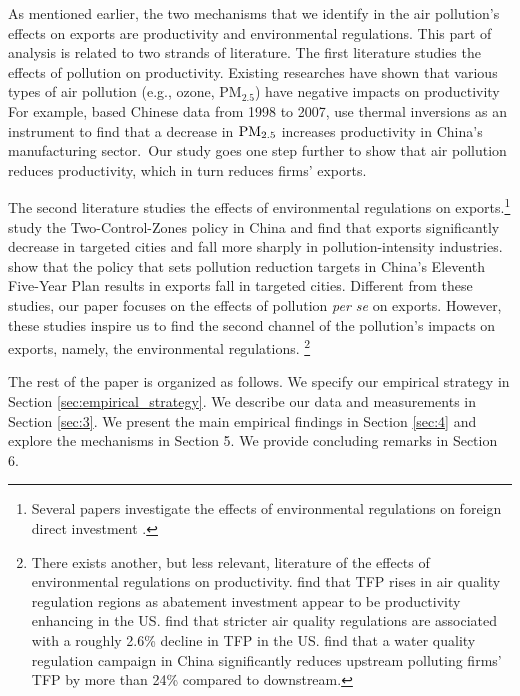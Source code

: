 \documentclass[12pt]{article}
\begin{document}
As mentioned earlier, the two mechanisms that we identify in the air
pollution's effects on exports are productivity and environmental
regulations. This part of analysis is related to two strands of literature.
The first literature studies the effects of pollution on productivity.
Existing researches have shown that various types of air pollution (e.g.,
ozone, $\mathrm{PM_{2.5}}$) have negative impacts on productivity %
\citep{graff2012impact,chang2016particulate,fu2021air,adhvaryu2022management}
For example, based Chinese data from 1998 to 2007, \cite{fu2021air} use
thermal inversions as an instrument to find that a decrease in $\mathrm{%
PM_{2.5}}$ increases productivity in China's manufacturing sector.\ Our
study goes one step further to show that air pollution reduces productivity,
which in turn reduces firms' exports.

The second literature studies the effects of environmental regulations on
exports.\footnote{%
Several papers investigate the effects of environmental regulations on
foreign direct investment \citep{dean2009foreign,cai2016does}.} \cite%
{hering2014environmental} study the Two-Control-Zones policy in China and
find that exports significantly decrease in targeted cities and fall more
sharply in pollution-intensity industries. \cite{shi2018environmental} show
that the policy that sets pollution reduction targets in China's Eleventh
Five-Year Plan results in exports fall in targeted cities. Different from
these studies, our paper focuses on the effects of pollution \textit{per se}
on exports. However, these studies inspire us to find the second channel of
the pollution's impacts on exports, namely, the environmental regulations.%
\footnote{%
There exists another, but less relevant, literature of the effects of
environmental regulations on productivity. \cite{berman2001environmental}
find that TFP rises in air quality regulation regions as abatement
investment appear to be productivity enhancing in the US. \cite{NBERw18392}
find that stricter air quality regulations are associated with a roughly
2.6\% decline in TFP in the US. \cite{he2020watering} find that a water
quality regulation campaign in China significantly reduces upstream
polluting firms' TFP by more than 24\% compared to downstream.}

The rest of the paper is organized as follows. We specify our empirical
strategy in Section \ref{sec:empirical_strategy}. We describe our data and measurements in Section \ref{sec:3}.
We present the main empirical findings in Section \ref{sec:4} and explore the
mechanisms in Section 5. We provide concluding remarks in Section 6.
\end{document}
